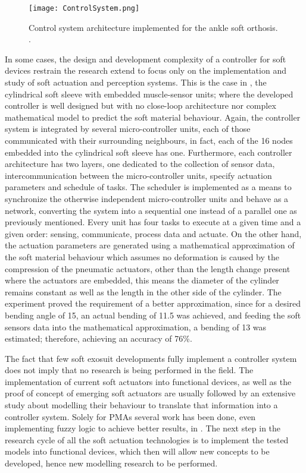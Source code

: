 \begin{figure}[hbtp!]
    \centering
    \texttt{[image: ControlSystem.png]}
    \caption{Control system architecture implemented for the ankle soft orthosis. \cite{park2011bio}. }
    \label{fig:control_system}
\end{figure}

In some cases, the design and development complexity of a controller for soft devices restrain the research extend to focus only on the implementation and study of soft actuation and perception systems. This is the case in \cite{Park2012}, the cylindrical soft sleeve with embedded muscle-sensor units; where the developed controller is well designed but with no close-loop architecture nor complex mathematical model to predict the soft material behaviour. Again, the controller system is integrated by several micro-controller units, each of those communicated with their surrounding neighbours, in fact, each of the 16 nodes embedded into the cylindrical soft sleeve has one. Furthermore, each controller architecture has two layers, one dedicated to the collection of sensor data, intercommunication between the micro-controller units, specify actuation parameters and schedule of tasks. The scheduler is implemented as a means to synchronize the otherwise independent micro-controller units and behave as a network, converting the system into a sequential one instead of a parallel one as previously mentioned. Every unit has four tasks to execute at a given time and a given order: sensing, communicate, process data and actuate. On the other hand, the actuation parameters are generated using a mathematical approximation of the soft material behaviour which assumes no deformation is caused by the compression of the pneumatic actuators, other than the length change present where the actuators are embedded, this means the diameter of the cylinder remains constant as well as the length in the other side of the cylinder. The experiment proved the requirement of a better approximation, since for a desired bending angle of 15\textdegree{}, an actual bending of 11.5\textdegree{} was achieved, and feeding the soft sensors data into the mathematical approximation, a bending of 13\textdegree{} was estimated; therefore, achieving an accuracy of 76\%.

The fact that few soft exosuit developments fully implement a controller system does not imply that no research is being performed in the field. The implementation of current soft actuators into functional devices, as well as the proof of concept of emerging soft actuators are usually followed by an extensive study about modelling their behaviour to translate that information into a controller system. Solely for PMAs several work has been done, even implementing fuzzy logic to achieve better results, in \cite{Chang2015,Skorina2015,Bishop-Moser2015,Hosovsky2016}. The next step in the research cycle of all the soft actuation technologies is to implement the tested models into functional devices, which then will allow new concepts to be developed, hence new modelling research to be performed.

